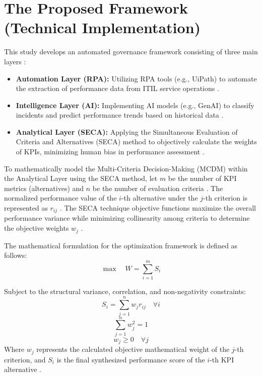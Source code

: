 \documentclass[12pt,a4paper,oneside]{report}
\begin{document}
\section{The Proposed Framework (Technical Implementation)}
This study develops an automated governance framework consisting of three main layers \cite{almontaser2025}:
\begin{itemize}
    \item \textbf{Automation Layer (RPA):} Utilizing RPA tools (e.g., UiPath) to automate the extraction of performance data from ITIL service operations \cite{almontaser2025}.
    \item \textbf{Intelligence Layer (AI):} Implementing AI models (e.g., GenAI) to classify incidents and predict performance trends based on historical data \cite{almontaser2025}.
    \item \textbf{Analytical Layer (SECA):} Applying the Simultaneous Evaluation of Criteria and Alternatives (SECA) method to objectively calculate the weights of KPIs, minimizing human bias in performance assessment \cite{almontaser2025}.
\end{itemize}

To mathematically model the Multi-Criteria Decision-Making (MCDM) within the Analytical Layer using the SECA method, let $m$ be the number of KPI metrics (alternatives) and $n$ be the number of evaluation criteria \cite{seca_method_2021}. The normalized performance value of the $i$-th alternative under the $j$-th criterion is represented as $r_{ij}$ \cite{seca_method_2021}. The SECA technique objective functions maximize the overall performance variance while minimizing collinearity among criteria to determine the objective weights $w_j$ \cite{seca_method_2021}.

The mathematical formulation for the optimization framework is defined as follows:
\begin{equation}
\max \quad W = \sum_{i=1}^{m} S_i
\end{equation}

Subject to the structural variance, correlation, and non-negativity constraints:
\begin{equation}
S_i = \sum_{j=1}^{n} w_j r_{ij} \quad \forall i
\end{equation}
\begin{equation}
\sum_{j=1}^{n} w_j^2 = 1
\end{equation}
\begin{equation}
w_j \ge 0 \quad \forall j
\end{equation}
Where $w_j$ represents the calculated objective mathematical weight of the $j$-th criterion, and $S_i$ is the final synthesized performance score of the $i$-th KPI alternative \cite{seca_method_2021}.
\end{document}
